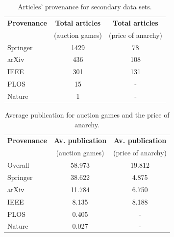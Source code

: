 \documentclass{article}
\theoremstyle{definition}
\begin{document}
\begin{table}[!hbtp]
    \begin{center}
    \begin{tabular}{lcc}
        \toprule
        \textbf{Provenance} & \textbf{Total articles} & \textbf{Total articles}\\
                   & (auction games) & (price of anarchy)\\
        \midrule
        Springer   &                1429 &                78 \\
        arXiv      &                 436 &                108 \\
        IEEE       &                 301 &                131 \\
        PLOS       &                  15 &                 -  \\
        Nature     &                   1 &                 -   \\
        \bottomrule
    \end{tabular}
    \end{center}
    \caption{Articles' provenance for secondary data sets.}
    \label{table:provenance_other_topics}
\end{table}

\begin{table}[!hbtp]
    \begin{center}
    \begin{tabular}{lcc}
        \toprule
        \textbf{Provenance} & \textbf{Av. publication}  & \textbf{Av. publication}\\
                            & (auction games) & (price of anarchy)\\
        \midrule
        Overall             &          58.973 & 19.812 \\
        Springer            &          38.622 & 4.875  \\
        arXiv               &          11.784 & 6.750   \\
        IEEE                &           8.135 & 8.188    \\
        PLOS                &           0.405 &   -       \\
        Nature              &           0.027 &   -        \\
        \bottomrule
    \end{tabular}
    \end{center}
    \caption{Average publication for auction games and the price of anarchy.}
    \label{table:other_topics_publication_rates}
\end{table}
\end{document}
